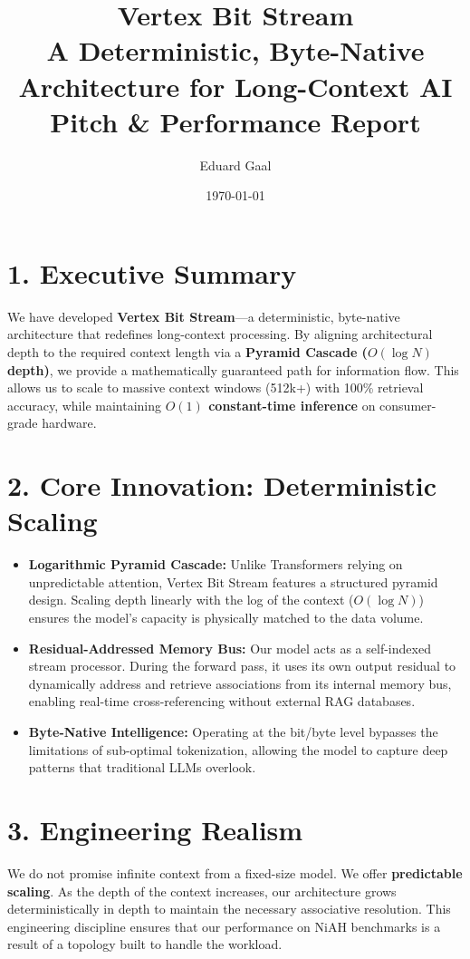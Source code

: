 \documentclass[a4paper,12pt]{article}
\title{\textbf{Vertex Bit Stream} \\ \Large A Deterministic, Byte-Native Architecture for Long-Context AI \\ \vspace{0.5cm} \large Pitch \& Performance Report}
\author{Eduard Gaal}
\date{\today}
\begin{document}
\maketitle

\section*{1. Executive Summary}
We have developed \textbf{Vertex Bit Stream}—a deterministic, byte-native architecture that redefines long-context processing. By aligning architectural depth to the required context length via a \textbf{Pyramid Cascade ($O(\log N)$ depth)}, we provide a mathematically guaranteed path for information flow. This allows us to scale to massive context windows (512k+) with 100\% retrieval accuracy, while maintaining \textbf{$O(1)$ constant-time inference} on consumer-grade hardware.

\section*{2. Core Innovation: Deterministic Scaling}
\begin{itemize}
    \item \textbf{Logarithmic Pyramid Cascade:} Unlike Transformers relying on unpredictable attention, Vertex Bit Stream features a structured pyramid design. Scaling depth linearly with the log of the context ($O(\log N)$) ensures the model’s capacity is physically matched to the data volume.
    \item \textbf{Residual-Addressed Memory Bus:} Our model acts as a self-indexed stream processor. During the forward pass, it uses its own output residual to dynamically address and retrieve associations from its internal memory bus, enabling real-time cross-referencing without external RAG databases.
    \item \textbf{Byte-Native Intelligence:} Operating at the bit/byte level bypasses the limitations of sub-optimal tokenization, allowing the model to capture deep patterns that traditional LLMs overlook.
\end{itemize}

\section*{3. Engineering Realism}
We do not promise infinite context from a fixed-size model. We offer \textbf{predictable scaling}. As the depth of the context increases, our architecture grows deterministically in depth to maintain the necessary associative resolution. This engineering discipline ensures that our performance on NiAH benchmarks is a result of a topology built to handle the workload.
\end{document}
